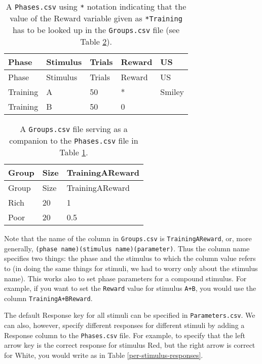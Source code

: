 \documentclass[11pt,]{article}
\begin{document}
\begin{longtable}[c]{@{}lllll@{}}
\caption{A \texttt{Phases.csv} using \texttt{*} notation indicating that
the value of the Reward variable given as \texttt{*Training} has to be
looked up in the \texttt{Groups.csv} file (see Table
\ref{groups-phases-star-notation}).
\label{phases-star-notation}}\tabularnewline
\toprule
Phase & Stimulus & Trials & Reward & US\tabularnewline
\midrule
\endfirsthead
\toprule
Phase & Stimulus & Trials & Reward & US\tabularnewline
\midrule
\endhead
Training & A & 50 & * & Smiley\tabularnewline
Training & B & 50 & 0 &\tabularnewline
\bottomrule
\end{longtable}

\begin{longtable}[c]{@{}lll@{}}
\caption{A \texttt{Groups.csv} file serving as a companion to the
\texttt{Phases.csv} file in Table \ref{phases-star-notation}.
\label{groups-phases-star-notation}}\tabularnewline
\toprule
Group & Size & TrainingAReward\tabularnewline
\midrule
\endfirsthead
\toprule
Group & Size & TrainingAReward\tabularnewline
\midrule
\endhead
Rich & 20 & 1\tabularnewline
Poor & 20 & 0.5\tabularnewline
\bottomrule
\end{longtable}

Note that the name of the column in \texttt{Groups.csv} is
\texttt{TrainingAReward}, or, more generally,
\texttt{(phase name)(stimulus name)(parameter)}. Thus the column name
specifies two things: the phase and the stimulus to which the column
value refers to (in doing the same things for stimuli, we had to worry
only about the stimulus name). This works also to set phase parameters
for a compound stimulus. For example, if you want to set the
\texttt{Reward} value for stimulus \texttt{A+B}, you would use the
column \texttt{TrainingA+BReward}.


The default Response key for all stimuli can be specified in
\texttt{Parameters.csv}. We can also, however, specify different
responses for different stimuli by adding a Response column to the
\texttt{Phases.csv} file. For example, to specify that the left arrow
key is the correct response for stimulus Red, but the right arrow is
correct for White, you would write as in Table
\ref{per-stimulus-responses}.
\end{document}
